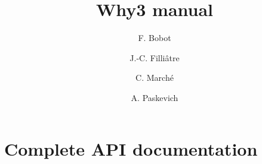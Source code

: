 \documentclass[a4paper]{memoir}
\begin{document}
\title{Why3 manual}
\author{F. Bobot \and J.-C. Filli\^atre \and C. March\'e \and A. Paskevich}
\maketitle

\cleardoublepage

\tableofcontents









\chapter{Complete API documentation}


\end{document}
